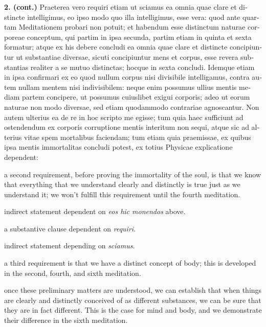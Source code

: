 \clearpage

\beginnumbering
\pstart
{}
\begin{latin}
    \textenglish{\textbf{2. (cont.)}} Praeterea vero requiri etiam ut sciamus ea omnia quae clare et distincte intelligimus, eo ipso modo quo illa intelligimus, esse vera: quod ante quartam Meditationem probari non potuit; et habendum esse distinctum naturae corporeae conceptum, qui partim in ipsa secunda, partim etiam in quinta et sexta formatur; atque ex his debere concludi ea omnia quae clare et distincte concipiuntur ut substantiae diversae, sicuti concipiuntur mens et corpus, esse revera substantias realiter a se mutuo distinctas; hocque in sexta concludi. Idemque etiam in ipsa confirmari ex eo quod nullum corpus nisi divisibile intelligamus, contra autem nullam mentem nisi indivisibilem: neque enim possumus ullius mentis mediam partem concipere, ut possumus cuiuslibet  exigui corporis; adeo ut eorum naturae non modo diversae, sed etiam quodammodo contrariae agnoscantur. Non autem ulterius ea de re in hoc scripto me egisse; tum quia haec sufficiunt ad ostendendum ex corporis corruptione mentis interitum non sequi, atque sic ad alterius vitae spem mortalibus faciendam; tum etiam quia praemissae, ex quibus ipsa mentis immortalitas concludi potest, ex totius Physicae explicatione dependent:
\end{latin}
\pend
\endnumbering

\prenotes

 a second requirement, before proving the immortality of the soul, is that we know that everything that we understand clearly and distinctly is true just as we understand it; we won't fulfill this requirement until the fourth meditation.

 indirect statement dependent on \textit{eos hic monendos} above.

 a substantive clause dependent on \textit{requiri}.

 indirect statement depending on \textit{sciamus}.

 a third requirement is that we have a distinct concept of body; this is developed in the second, fourth, and sixth meditation.

 once these preliminary matters are understood, we can establish that when things are clearly and distinctly conceived of as different substances, we can be sure that they are in fact different. This is the case for mind and body, and we demonstrate their difference in the sixth meditation.

